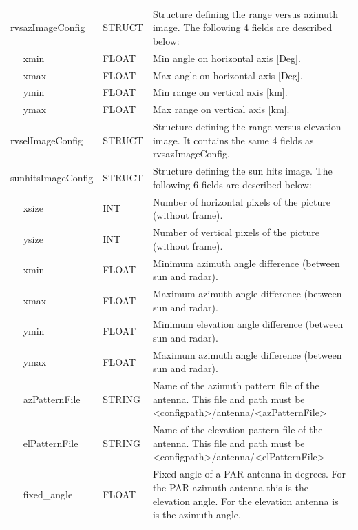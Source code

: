 \documentclass[a4paper,11pt,pdftex,twoside]{scrartcl}
\begin{document}
{{{\begin{longtable}{p{}p{}p{}}
rvsazImageConfig     & STRUCT    & Structure defining the range versus azimuth image. The following 4 fields are described below:\\
$\quad$ xmin       & FLOAT     & Min angle on horizontal axis [Deg].\\
$\quad$ xmax       & FLOAT     & Max angle on horizontal axis [Deg].\\
$\quad$ ymin       & FLOAT     & Min range on vertical axis [km].\\
$\quad$ ymax       & FLOAT     & Max range on vertical axis [km].\\

rvselImageConfig     & STRUCT    & Structure defining the range versus elevation image. It contains the same 4 fields as rvsazImageConfig.\\

sunhitsImageConfig     & STRUCT    & Structure defining the sun hits image. The following 6 fields are described below:\\
$\quad$ xsize      & INT      & Number of horizontal pixels of the picture (without frame).\\
$\quad$ ysize      & INT    & Number of vertical pixels of the picture (without frame).\\
$\quad$ xmin      & FLOAT  & Minimum azimuth angle difference (between sun and radar).\\
$\quad$ xmax     & FLOAT  & Maximum azimuth angle difference (between sun and radar).\\
$\quad$ ymin      & FLOAT  & Minimum elevation angle difference (between sun and radar).\\
$\quad$ ymax     & FLOAT  & Maximum azimuth angle difference (between sun and radar).\\


$\quad$ azPatternFile & STRING & Name of the azimuth pattern file of the antenna. This file and
                                 path must be
                                 <configpath>/antenna/<azPatternFile>\\
$\quad$ elPatternFile & STRING & Name of the elevation pattern file of the antenna. This file and
                                 path must be
                                 <configpath>/antenna/<elPatternFile>\\
$\quad$ fixed\_angle  & FLOAT  & Fixed angle of a PAR antenna in degrees. For the PAR azimuth
                                 antenna this is the elevation angle. For the elevation antenna
                                 is is the azimuth angle.\\
\end{longtable}


}}}
\end{document}
